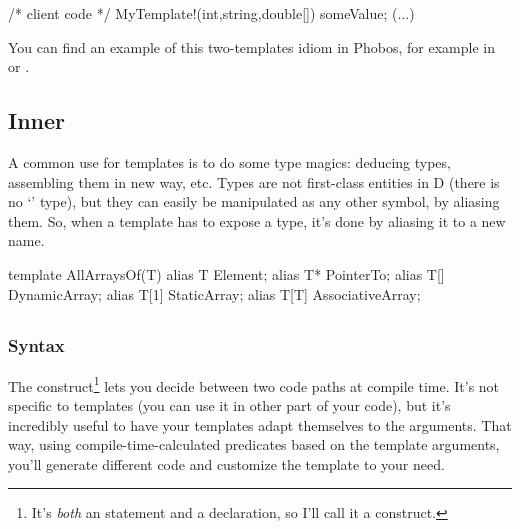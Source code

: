 \begin{dcode}
/* client code */
MyTemplate!(int,string,double[]) someValue;
(...)
\end{dcode}

You can find an example of this two-templates idiom in Phobos, for example in  or .

\subsection{\texorpdfstring{Inner }
                           {Inner alias}}
\label{inneralias}

A common use for templates is to do some type magics: deducing types, assembling them in new way, etc. Types are not first-class entities in D (there is no `' type), but they can easily be manipulated as any other symbol, by aliasing them. So, when a template has to expose a type, it's done by aliasing it to a new name.
\begin{dcode}
template AllArraysOf(T)
{
    alias T    Element;
    alias T*   PointerTo;
    alias T[]  DynamicArray;
    alias T[1] StaticArray;
    alias T[T] AssociativeArray;
}
\end{dcode}


\subsection{\texorpdfstring{}
                           {static if}}
\label{staticif}

\subsubsection{Syntax}

The  construct\footnote{ It's \emph{both} an statement and a declaration, so I'll call it a construct.}
lets you decide between two code paths at compile time. It's not specific to templates (you can use it in other part of your code), but it's incredibly useful to have your templates adapt themselves to the arguments. That way, using compile-time-calculated predicates based on the template arguments, you'll generate different code and customize the template to your need.


